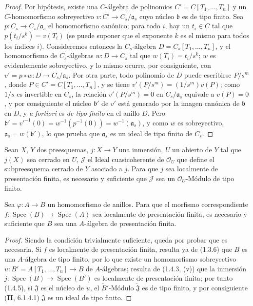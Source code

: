 \begin{proof}
Por hipótesis, existe una $C$-álgebra de polinomios
$C'=C[T_1,\ldots,T_n]$ y un $C$-homomorfismo sobreyectivo
$v:C'\to C_s/\mathfrak a_s$ cuyo núcleo $\mathfrak b$ es de tipo finito.
Sea $p:C_s\to C_s/\mathfrak a_s$ el homomorfismo canónico; para todo $i$,
hay un $t_i\in C$ tal que $p(t_i/s^k)=v(T_i)$ (se puede suponer que
el exponente $k$ es el mismo para todos los índices $i$). Consideremos entonces la
$C_s$-álgebra $D=C_s[T_1,\ldots,T_n]$, y el homomorfismo de $C_s$-álgebras
$w:D\to C_s$ tal que $w(T_i)=t_i/s^k$; $w$ es evidentemente sobreyectivo, y lo
mismo ocurre, por consiguiente, con $v'=p\circ w:D\to C_s/\mathfrak a_s$. Por otra
parte, todo polinomio de $D$ puede escribirse $P/s^m$, donde
$P\in C'=C[T_1,\ldots,T_n]$, y se tiene
$v'(P/s^m)=(1/s^m)v(P)$; como $1/s$ es invertible en $C_s$, la relación
$v'(P/s^m)=0$ en $C_s/\mathfrak a_s$ equivale a $v(P)=0$, y por consiguiente el
núcleo $\mathfrak b'$ de $v'$ está generado por la imagen canónica de
$\mathfrak b$ en $D$, y \emph{a fortiori} es \emph{de tipo finito} en el anillo
$D$. Pero
$\mathfrak b'=v'^{-1}(0)=w^{-1}(p^{-1}(0))=w^{-1}(\mathfrak a_s)$, y como
$w$ es sobreyectivo, $\mathfrak a_s=w(\mathfrak b')$, lo que prueba que
$\mathfrak a_s$ es un ideal de tipo finito de $C_s$.
\end{proof}

\begin{corollary}[1.4.5]
\label{IV.1.4.5-fr}
Sean $X$, $Y$ dos preesquemas, $j:X\to Y$ una inmersión, $U$ un abierto de
$Y$ tal que $j(X)$ sea cerrado en $U$, $\mathcal J$ el Ideal cuasicoherente de
$\mathcal O_U$ que define el subpreesquema cerrado de $Y$ asociado a $j$. Para
que $j$ sea localmente de presentación finita, es necesario y suficiente que
$\mathcal J$ sea un $\mathcal O_U$-Módulo de tipo finito.
\end{corollary}

\par\medskip\noindent
\begin{proposition}[1.4.6]
\label{IV.1.4.6-fr}
Sea $\varphi:A\to B$ un homomorfismo de anillos. Para que el morfismo
correspondiente $f:\operatorname{Spec}(B)\to\operatorname{Spec}(A)$ sea localmente de presentación finita,
es necesario y suficiente que $B$ sea una $A$-álgebra de presentación finita.
\end{proposition}

\begin{proof}
Siendo la condición trivialmente suficiente, queda por probar que es
necesaria. Si $f$ es localmente de presentación finita, resulta ya de
(1.3.6) que $B$ es una $A$-álgebra de tipo finito, por lo que existe un
homomorfismo sobreyectivo $u:B'=A[T_1,\ldots,T_n]\to B$ de $A$-álgebras;
resulta de (1.4.3, (v)) que la inmersión
$j:\operatorname{Spec}(B)\to\operatorname{Spec}(B')$ es localmente
de presentación finita; por tanto (1.4.5), si $\mathfrak J$ es el núcleo de $u$,
el $\widetilde{B}'$-Módulo $\widetilde{\mathfrak J}$ es de tipo finito, y por
consiguiente (\textbf{II}, 6.1.4.1) $\mathfrak J$ es un ideal de tipo finito.
\end{proof}

